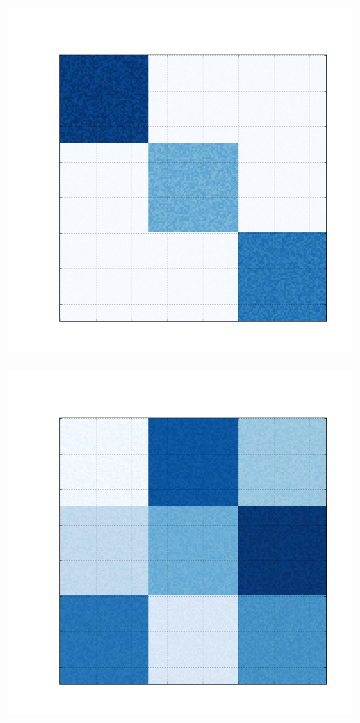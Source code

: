 \documentclass[
    12pt,                %
    oneside,            %
    a4paper,            %
    english,            %
    brazil                %
    ]{abntex2ppgsi}
\begin{document}
\begin{figure}[H]
\begin{subfigure}[b]{0.18\textwidth}
        \includegraphics[width=\textwidth]{img/b-bic-structure.png}
    \end{subfigure}
    \begin{subfigure}[b]{0.18\textwidth}
        \includegraphics[width=\textwidth]{img/c-bic-structure.png}

\end{subfigure}
\end{figure}
\end{document}
